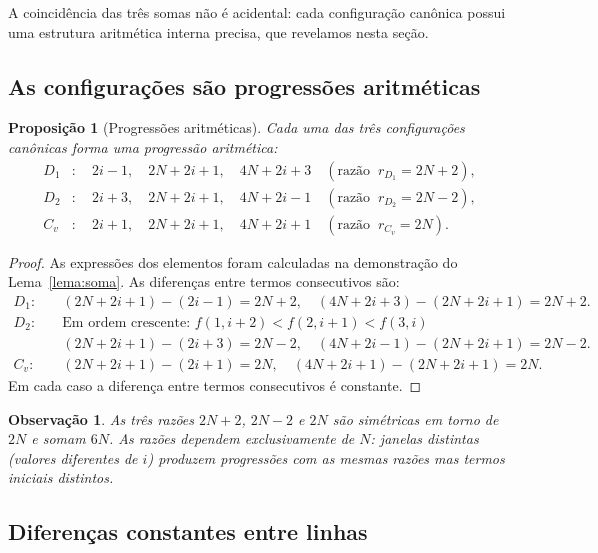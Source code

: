 \documentclass[12pt, a4paper]{article}
\newtheorem{proposicao}[lema]{Proposição}
\newtheorem{observacao}[lema]{Observação}
\begin{document}
	A coincidência das três somas não é acidental: cada configuração canônica possui uma
	estrutura aritmética interna precisa, que revelamos nesta seção.
	
	\subsection{As configurações são progressões aritméticas}
	
	\begin{proposicao}[Progressões aritméticas]
		\label{prop:pa}
		Cada uma das três configurações canônicas forma uma progressão aritmética:
		\begin{align*}
			D_1 &:\quad 2i-1,\quad 2N+2i+1,\quad 4N+2i+3
			\quad(\text{razão }\ r_{D_1}=2N+2),\\
			D_2 &:\quad 2i+3,\quad 2N+2i+1,\quad 4N+2i-1
			\quad(\text{razão }\ r_{D_2}=2N-2),\\
			C_v &:\quad 2i+1,\quad 2N+2i+1,\quad 4N+2i+1
			\quad(\text{razão }\ r_{C_v}=2N).
		\end{align*}
	\end{proposicao}
	
	\begin{proof}
		As expressões dos elementos foram calculadas na demonstração do Lema~\ref{lema:soma}.
		As diferenças entre termos consecutivos são:
		\begin{align*}
			D_1:\quad & (2N+2i+1)-(2i-1) = 2N+2,\quad (4N+2i+3)-(2N+2i+1)=2N+2.\\
			D_2:\quad & \text{Em ordem crescente: } f(1,i+2)< f(2,i+1)< f(3,i)\\
			& (2N+2i+1)-(2i+3) = 2N-2,\quad (4N+2i-1)-(2N+2i+1)=2N-2.\\
			C_v:\quad & (2N+2i+1)-(2i+1) = 2N,\quad (4N+2i+1)-(2N+2i+1)=2N.
		\end{align*}
		Em cada caso a diferença entre termos consecutivos é constante.
	\end{proof}
	
	\begin{observacao}
		As três razões $2N+2$, $2N-2$ e $2N$ são simétricas em torno de $2N$ e somam
		$6N$. As razões dependem exclusivamente de $N$: janelas distintas (valores diferentes
		de $i$) produzem progressões com as mesmas razões mas termos iniciais distintos.
	\end{observacao}
	
	\subsection{Diferenças constantes entre linhas}
	
\end{document}
